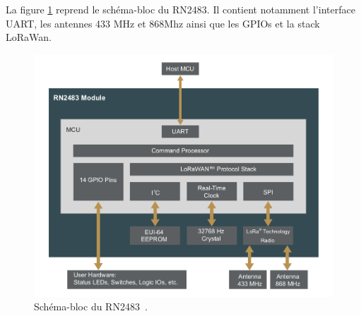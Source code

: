     La figure \ref{fig:state-rn2484-block} reprend le schéma-bloc du RN2483. Il contient notamment l'interface UART, les antennes 433 MHz et 868Mhz ainsi que les GPIOs et la stack LoRaWan.
    \begin{figure}[H]
        \centering
        \includegraphics[scale=0.3]{res/pictures/rn2483-block-diagram.png}
        \caption{Schéma-bloc du RN2483~\cite{rn2483:datasheet}.}
        \label{fig:state-rn2484-block}
    \end{figure}

